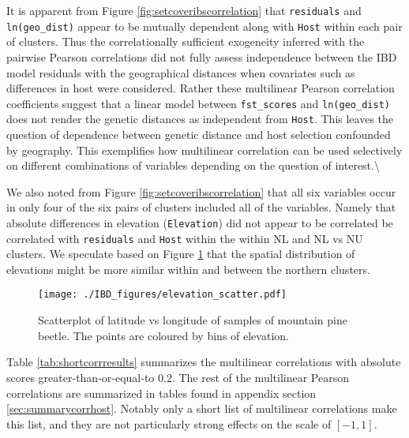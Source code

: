 \documentclass[
  letterpaper,
  DIV=11,
  numbers=noendperiod]{scrreprt}
\begin{document}
It is apparent from Figure \ref{fig:setcoveribscorrelation} that
\texttt{residuals} and \texttt{ln(geo\_dist)} appear to be mutually
dependent along with \texttt{Host} within each pair of clusters. Thus
the correlationally sufficient exogeneity inferred with the pairwise
Pearson correlations did not fully assess independence between the IBD
model residuals with the geographical distances when covariates such as
differences in host were considered. Rather these multilinear Pearson
correlation coefficients suggest that a linear model between
\texttt{fst\_scores} and \texttt{ln(geo\_dist)} does not render the
genetic distances as independent from \texttt{Host}. This leaves the
question of dependence between genetic distance and host selection
confounded by geography. This exemplifies how multilinear correlation
can be used selectively on different combinations of variables depending
on the question of interest.\textbackslash{}

We also noted from Figure \ref{fig:setcoveribscorrelation} that all six
variables occur in only four of the six pairs of clusters included all
of the variables. Namely that absolute differences in elevation
(\texttt{Elevation}) did not appear to be correlated be correlated with
\texttt{residuals} and \texttt{Host} within the within NL and NL vs NU
clusters. We speculate based on Figure \ref{fig:elevationdist} that the
spatial distribution of elevations might be more similar within and
between the northern clusters.

\begin{figure}[H]
    \centering
    \texttt{[image: ./IBD\_figures/elevation\_scatter.pdf]}
    \caption{Scatterplot of latitude vs longitude of samples of mountain pine beetle. The points are coloured by bins of elevation.}
    \label{fig:elevationdist}
\end{figure}

Table \ref{tab:shortcorrresults} summarizes the multilinear correlations
with absolute scores greater-than-or-equal-to 0.2. The rest of the
multilinear Pearson correlations are summarized in tables found in
appendix section \ref{sec:summarycorrhost}. Notably only a short list of
multilinear correlations make this list, and they are not particularly
strong effects on the scale of \([-1,1]\).
\end{document}
